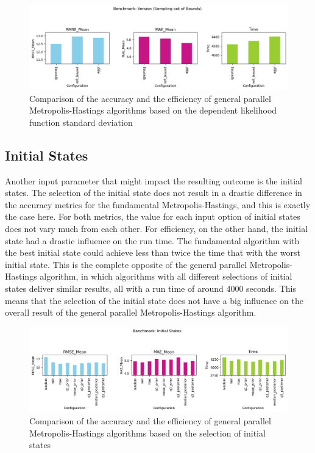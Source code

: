 \begin{figure}[H]
    \centering
    \includegraphics[width=1\textwidth]{figures/gpmh/sotb.png}
    \captionsetup{width=.8\textwidth}
    \caption{Comparison of the accuracy and the efficiency of general parallel Metropolis-Hastings algorithms based on the dependent likelihood function standard deviation}
    \label{fig:enter-label}
\end{figure}

\subsection{Initial States}
Another input parameter that might impact the resulting outcome is the initial states. The selection of the initial state does not result in a drastic difference in the accuracy metrics for the fundamental Metropolis-Hastings, and this is exactly the case here. For both metrics, the value for each input option of initial states does not vary much from each other. For efficiency, on the other hand, the initial state had a drastic influence on the run time. The fundamental algorithm with the best initial state could achieve less than twice the time that with the worst initial state. This is the complete opposite of the general parallel Metropolis-Hastings algorithm, in which algorithms with all different selections of initial states deliver similar results, all with a run time of around 4000 seconds. This means that the selection of the initial state does not have a big influence on the overall result of the general parallel Metropolis-Hastings algorithm. 

\begin{figure}[H]
    \centering
    \includegraphics[width=1\textwidth]{figures/gpmh/init_states.png}
    \captionsetup{width=.8\textwidth}
    \caption{Comparison of the accuracy and the efficiency of general parallel Metropolis-Hastings algorithms based on the selection of initial states}
    \label{fig:enter-label}
\end{figure}

